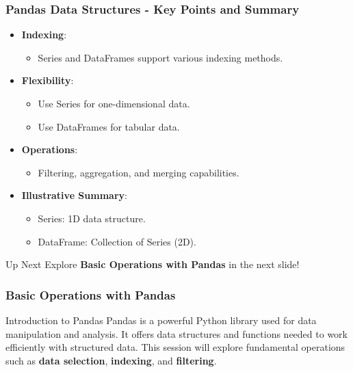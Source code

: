\documentclass[aspectratio=169]{beamer}
\begin{document}
\begin{frame}[fragile]
    \frametitle{Pandas Data Structures - Key Points and Summary}
    \begin{itemize}
        \item \textbf{Indexing}:
        \begin{itemize}
            \item Series and DataFrames support various indexing methods.
        \end{itemize}
        \item \textbf{Flexibility}:
        \begin{itemize}
            \item Use Series for one-dimensional data.
            \item Use DataFrames for tabular data.
        \end{itemize}
        \item \textbf{Operations}:
        \begin{itemize}
            \item Filtering, aggregation, and merging capabilities.
        \end{itemize}
        \item \textbf{Illustrative Summary}:
        \begin{itemize}
            \item Series: 1D data structure.
            \item DataFrame: Collection of Series (2D).
        \end{itemize}
    \end{itemize}    
    \begin{block}{Up Next}
        Explore \textbf{Basic Operations with Pandas} in the next slide!
    \end{block}
\end{frame}

\begin{frame}
    \frametitle{Basic Operations with Pandas}
    \begin{block}{Introduction to Pandas}
        Pandas is a powerful Python library used for data manipulation and analysis. It offers data structures and functions needed to work efficiently with structured data. This session will explore fundamental operations such as \textbf{data selection}, \textbf{indexing}, and \textbf{filtering}.
    \end{block}
\end{frame}
\end{document}
